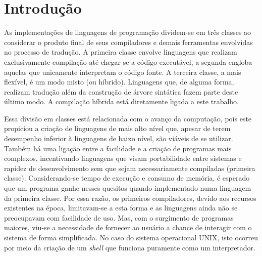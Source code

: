 \chapter{Introdução}


As implementações de linguagens de programação dividem-se em três
classes ao
considerar o produto final de seus compiladores e demais
ferramentas envolvidas no processo de tradução. A primeira classe
envolve linguagens que realizam exclusivamente compilação até
chegar-se a código executável, a segunda engloba aquelas que
unicamente interpretam o código fonte. A terceira classe, a mais
flexível, é um modo misto (ou híbrido). Linguagens que, de alguma forma,
realizam tradução além da construção de árvore sintática fazem parte
deste último modo. A compilação híbrida está diretamente ligada a este
trabalho.

Essa divisão em classes está relacionada com o avanço da computação,
pois este propiciou
a criação de linguagens de mais alto nível que, apesar de
terem desempenho inferior à linguagens de baixo nível,
são viáveis de se utilizar. Também há uma ligação entre a facilidade e a
criação de programas mais complexos, incentivando linguagens que visam
portabilidade entre sistemas e rapidez de desenvolvimento sem
que sejam necessariamente compiladas (primeira classe).
Considerando-se tempo de execução e
consumo de memória, é esperado que um programa ganhe
nesses quesitos quando implementado numa linguagem da primeira
classe. Por essa razão,
 os primeiros compiladores,
devido aos recursos existentes na época, limitavam-se a esta
forma e as linguagens ainda não se preocupavam com facilidade de uso.
Mas, com o surgimento de programas maiores, viu-se a necessidade de
fornecer ao usuário a chance de interagir com o sistema de forma
simplificada. %
No caso do
sistema operacional UNIX, isto ocorreu por meio da criação de
um \textit{shell} que funciona puramente como um interpretador.


